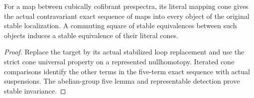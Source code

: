 \begin{proposition}
  \label{prop:actual-cofibrant-cone-exactness-and-stability}
  \leanok
  For a map between cubically cofibrant prespectra, its literal mapping cone gives the actual contravariant exact sequence of maps into every object of the original stable localization. A commuting square of stable equivalences between such objects induces a stable equivalence of their literal cones.
\end{proposition}
\begin{proof}
  Replace the target by its actual stabilized loop replacement and use the strict cone universal property on a represented nullhomotopy. Iterated cone comparisons identify the other terms in the five-term exact sequence with actual suspensions. The abelian-group five lemma and representable detection prove stable invariance.
  \leanok
\end{proof}

